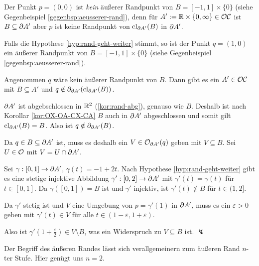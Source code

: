 %    
    \begin{gegenbsp}\label{gegenbsp:aeusserer-rand}
       Der Punkt $p=(0,0)$ ist \textit{kein} äußerer Randpunkt von $B=[-1,1] \times \{0\}$ (siehe Gegenbeispiel \ref{gegenbsp:aeusserer-rand}), denn für $A' := \mathbb{R} \times \{0,\infty\} \in \mathcal{OC}$ ist $B \subseteq \partial A'$ aber $p$ ist keine Randpunkt von $\text{cl}_{\partial A'} (B)$ in $\partial A'$.
    \end{gegenbsp}
%
    \begin{bsp}\label{bsp:aeusserer-rand}
        Falls die Hypothese \ref{hyp:rand-geht-weiter} stimmt, so ist
        der Punkt $q=(1,0)$ ein äußerer Randpunkt von $B=[-1,1] \times \{0\}$ (siehe Gegenbeispiel \ref{gegenbsp:aeusserer-rand}).
    \end{bsp}
%
    \begin{bew}
        Angenommen $q$ wäre kein äußerer Randpunkt von $B$.
        Dann gibt es ein $A' \in \mathcal{OC}$ mit $B \subseteq A'$ und $q \notin \partial_{\partial A'}(\text{cl}_{\partial A'}(B))$.
        
        $\partial A'$ ist abgebschlossen in $\mathbb{R}^2$ (\ref{kor:rand-abg}), genauso wie $B$. Deshalb ist nach Korollar \ref{kor:OX-OA-CX-CA} $B$ auch in $\partial A'$ abgeschlossen und somit gilt $\text{cl}_{\partial A'}(B) = B$.
        Also ist $q \notin \partial_{\partial A'}(B)$.
        
        Da $q \in B \subseteq \partial A'$ ist, muss es deshalb ein $V \in \mathcal{O}_{\partial A'}(q)$ geben mit $V \subseteq B$.
        Sei $U \in \mathcal{O}$ mit $V = U \cap \partial A'$.
        
        Sei $\gamma: [0,1] \to \partial A'$, $\gamma(t) = -1+2t$. 
        Nach Hypothese \ref{hyp:rand-geht-weiter} gibt es eine stetige injektive Abbildung $\gamma': [0,2] \to \partial A'$ mit $\gamma'(t) = \gamma(t)$ für $t \in [0,1]$.
        Da $\gamma([0,1]) = B$ ist und $\gamma'$ injektiv, ist $\gamma'(t) \notin B$ für $t \in (1,2]$.
        
        Da $\gamma'$ stetig ist und $V$ eine Umgebung von $p = \gamma'(1)$ in $\partial A'$, muss es ein $\varepsilon > 0$ geben mit $\gamma'(t) \in V$ für alle $t \in (1-\varepsilon, 1+\varepsilon)$.
        
        Also ist $\gamma'(1+\frac{\varepsilon}{2}) \in V \setminus B$, was ein Widerspruch zu $V \subseteq B$ ist. $\lightning$
    \end{bew}

    
    Der
    Begriff des äußeren Randes lässt sich verallgemeinern zum äußeren Rand $n$-ter Stufe. Hier genügt uns $n = 2$.
    
